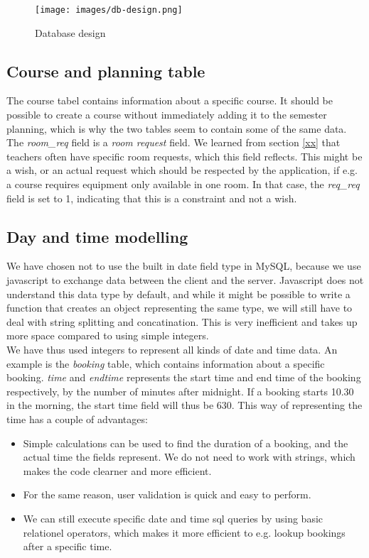 \begin{figure}[htb]
\begin{center}
\leavevmode
\texttt{[image: images/db-design.png]}
\end{center}
\caption{Database design}
\label{fig:db_design}
\end{figure}

\subsection{Course and planning table}
\label{sub:course_planning_table}
The course tabel contains information about a specific course. It should be possible to create a course without immediately adding it to the semester planning, which is why the two tables seem to contain some of the same data. The \emph{room\_req} field is a \emph{room request} field. We learned from section \ref{xx} that teachers often have specific room requests, which this field reflects. This might be a wish, or an actual request which should be respected by the application, if e.g. a course requires equipment only available in one room. In that case, the \emph{req\_req} field is set to 1, indicating that this is a constraint and not a wish. 

\subsection{Day and time modelling}
\label{sub:day_and_time_modelling}
We have chosen not to use the built in date field type in MySQL, because we use javascript to exchange data between the client and the server. Javascript does not understand this data type by default, and while it might be possible to write a function that creates an object representing the same type, we will still have to deal with string splitting and concatination. This is very inefficient and takes up more space compared to using simple integers.\\
We have thus used integers to represent all kinds of date and time data. An example is the \emph{booking} table, which contains information about a specific booking. \emph{time} and \emph{endtime} represents the start time and end time of the booking respectively, by the number of minutes after midnight. If a booking starts 10.30 in the morning, the start time field will thus be 630. This way of representing the time has a couple of advantages:

\begin{itemize}
	\item Simple calculations can be used to find the duration of a booking, and the actual time the fields represent. We do not need to work with strings, which makes the code clearner and more efficient.
	\item For the same reason, user validation is quick and easy to perform.
	\item We can still execute specific date and time sql queries by using basic relationel operators, which makes it more efficient to e.g. lookup bookings after a specific time.
\end{itemize}

